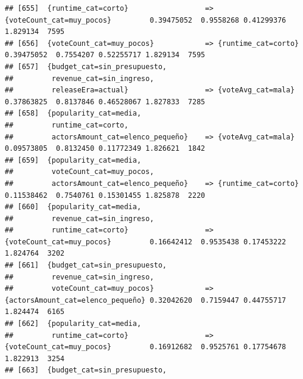 \documentclass[
]{article}
\begin{document}
\begin{verbatim}
## [655]  {runtime_cat=corto}                  => {voteCount_cat=muy_pocos}         0.39475052  0.9558268 0.41299376 1.829134  7595
## [656]  {voteCount_cat=muy_pocos}            => {runtime_cat=corto}               0.39475052  0.7554207 0.52255717 1.829134  7595
## [657]  {budget_cat=sin_presupuesto,                                                                                             
##         revenue_cat=sin_ingreso,                                                                                                
##         releaseEra=actual}                  => {voteAvg_cat=mala}                0.37863825  0.8137846 0.46528067 1.827833  7285
## [658]  {popularity_cat=media,                                                                                                   
##         runtime_cat=corto,                                                                                                      
##         actorsAmount_cat=elenco_pequeño}    => {voteAvg_cat=mala}                0.09573805  0.8132450 0.11772349 1.826621  1842
## [659]  {popularity_cat=media,                                                                                                   
##         voteCount_cat=muy_pocos,                                                                                                
##         actorsAmount_cat=elenco_pequeño}    => {runtime_cat=corto}               0.11538462  0.7540761 0.15301455 1.825878  2220
## [660]  {popularity_cat=media,                                                                                                   
##         revenue_cat=sin_ingreso,                                                                                                
##         runtime_cat=corto}                  => {voteCount_cat=muy_pocos}         0.16642412  0.9535438 0.17453222 1.824764  3202
## [661]  {budget_cat=sin_presupuesto,                                                                                             
##         revenue_cat=sin_ingreso,                                                                                                
##         voteCount_cat=muy_pocos}            => {actorsAmount_cat=elenco_pequeño} 0.32042620  0.7159447 0.44755717 1.824474  6165
## [662]  {popularity_cat=media,                                                                                                   
##         runtime_cat=corto}                  => {voteCount_cat=muy_pocos}         0.16912682  0.9525761 0.17754678 1.822913  3254
## [663]  {budget_cat=sin_presupuesto,                                                                                             

\end{verbatim}
\end{document}
